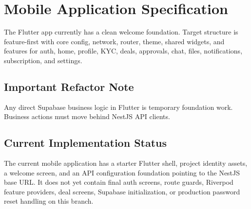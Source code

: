 \chapter{Mobile Application Specification}
The Flutter app currently has a clean welcome foundation. Target structure is feature-first with core config, network, router, theme, shared widgets, and features for auth, home, profile, KYC, deals, approvals, chat, files, notifications, subscription, and settings.
\section{Important Refactor Note}
Any direct Supabase business logic in Flutter is temporary foundation work. Business actions must move behind NestJS API clients.

\section{Current Implementation Status}
The current mobile application has a starter Flutter shell, project identity assets, a welcome screen, and an API configuration foundation pointing to the NestJS base URL. It does not yet contain final auth screens, route guards, Riverpod feature providers, deal screens, Supabase initialization, or production password reset handling on this branch.

